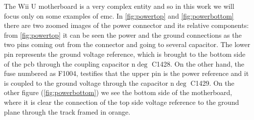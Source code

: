 \documentclass[11pt,a4paper,titlepage]{article}
\begin{document}
		  The Wii U motherboard is a very complex entity and so in this work we will focus only on some examples of \gls{emc}. In \autoref{fig:powertop} and \autoref{fig:powerbottom} there are two zoomed images of the power connector and its relative components: from \autoref{fig:powertop} it can be seen the power and the ground connections as the two pins coming out from the connector and going to several capacitor. The lower pin represents the ground voltage reference, which is brought to the bottom side of the \gls{pcb} through the coupling capacitor n$\deg$ C1428. On the other hand, the fuse numbered as F1004, testifies that the upper pin is the power reference and it is coupled to the ground voltage through the capacitor n$\deg$ C1429. On the other figure (\autoref{fig:powerbottom}) we see the bottom side of the motherboard, where it is clear the connection of the top side voltage reference to the ground plane through the track framed in orange.
\end{document}
